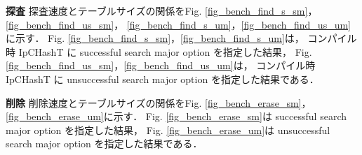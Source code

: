 %
{\bf 探査}
\samepage\newline\indent
探査速度とテーブルサイズの関係をFig. 
\ref{fig_bench_find_s_sm}，\ref{fig_bench_find_us_sm}，
\ref{fig_bench_find_s_um}，\ref{fig_bench_find_us_um}に示す．
Fig. \ref{fig_bench_find_s_sm}，\ref{fig_bench_find_s_um}は，
コンパイル時 IpCHashT に successful search major option を指定した結果，
Fig. \ref{fig_bench_find_us_sm}，\ref{fig_bench_find_us_um}は，
コンパイル時 IpCHashT に unsuccessful search major option を指定した結果である．
\leavevmode \newline

%
{\bf 削除}
\samepage\newline\indent
削除速度とテーブルサイズの関係をFig. 
\ref{fig_bench_erase_sm}，
\ref{fig_bench_erase_um}に示す．
Fig. \ref{fig_bench_erase_sm}は successful search major option を指定した結果，
Fig. \ref{fig_bench_erase_um}は unsuccessful search major option を指定した結果である．
\leavevmode \newline







